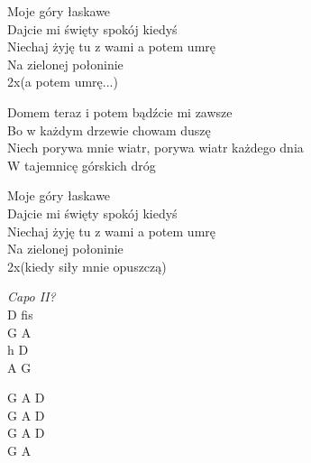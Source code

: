 \begin{text}
    \ifchorded{\hfill\break}
    Moje góry łaskawe\\
    Dajcie mi święty spokój kiedyś\\
    Niechaj żyję tu z wami a potem umrę\\
    Na zielonej połoninie\\
    2x(a potem umrę...)

    Domem teraz i potem bądźcie mi zawsze\\
    Bo w każdym drzewie chowam duszę\\
    Niech porywa mnie wiatr, porywa wiatr każdego dnia\\
    W tajemnicę górskich dróg

    Moje góry łaskawe\\
    Dajcie mi święty spokój kiedyś\\
    Niechaj żyję tu z wami a potem umrę\\
    Na zielonej połoninie\\
    2x(kiedy siły mnie opuszczą)
\end{text}
\begin{chord}
    \textit{Capo II?}\\
    D fis\\
    G A\\
    h D\\
    A G

    \hfill\break
    G A D\\
    G A D\\
    G A D\\
    G A
\end{chord}